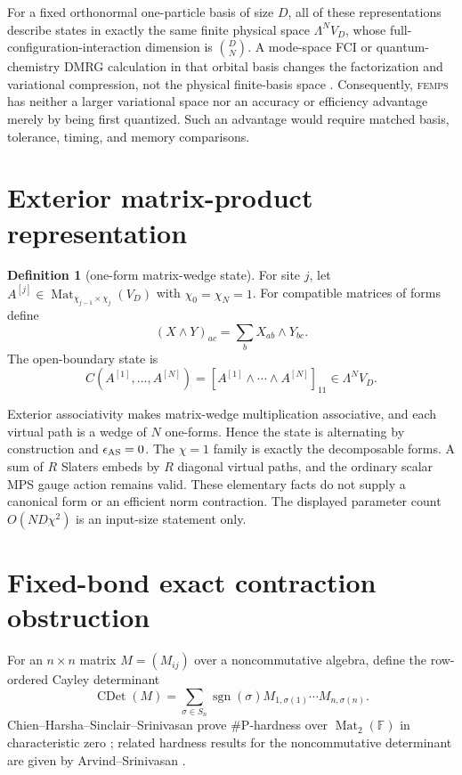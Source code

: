 \documentclass[aps,pra,reprint,superscriptaddress,nofootinbib,longbibliography,showkeys]{revtex4-2}
\theoremstyle{definition}
\newtheorem{definition}[theorem]{Definition}
\newcommand{\Mat}{\operatorname{Mat}}
\newcommand{\CDet}{\operatorname{CDet}}
\newcommand{\FEMPS}{\textnormal{\textsc{femps}}}
\begin{document}
For a fixed orthonormal one-particle basis of size $D$, all of these
representations describe states in exactly the same finite physical space
$\Lambda^N V_D$, whose full-configuration-interaction dimension is
$\binom{D}{N}$.  A mode-space FCI or quantum-chemistry DMRG calculation in
that orbital basis changes the factorization and variational compression, not
the physical finite-basis space \cite{ChanSharma2011DMRG,LiChan2016HSMPS}.
Consequently, \FEMPS{} has neither a larger variational space nor an accuracy
or efficiency advantage merely by being first quantized.  Such an advantage
would require matched basis, tolerance, timing, and memory comparisons.

\section{Exterior matrix-product representation}

\begin{definition}[one-form matrix-wedge state]
For site $j$, let
$A^{[j]}\in\Mat_{\chi_{j-1}\times\chi_j}(V_D)$ with
$\chi_0=\chi_N=1$.  For compatible matrices of forms define
\[
 (X\wedge Y)_{ac}=\sum_b X_{ab}\wedge Y_{bc}.
\]
The open-boundary state is
\begin{equation}
 C(A^{[1]},\ldots,A^{[N]})=
 [A^{[1]}\wedge\cdots\wedge A^{[N]}]_{11}
 \in\Lambda^N V_D.
 \label{eq:femps}
\end{equation}
\end{definition}

Exterior associativity makes matrix-wedge multiplication associative, and each
virtual path is a wedge of $N$ one-forms.  Hence the state is alternating by
construction and $\epsilon_{\rm AS}=0$.  The $\chi=1$ family is exactly the
decomposable forms.  A sum of $R$ Slaters embeds by $R$ diagonal virtual paths,
and the ordinary scalar MPS gauge action remains valid.  These elementary
facts do not supply a canonical form or an efficient norm contraction.  The
displayed parameter count $O(ND\chi^2)$ is an input-size statement only.

\section{Fixed-bond exact contraction obstruction}

For an $n\times n$ matrix $M=(M_{ij})$ over a noncommutative algebra, define
the row-ordered Cayley determinant
\[
 \CDet(M)=\sum_{\sigma\in S_n}\operatorname{sgn}(\sigma)
 M_{1,\sigma(1)}\cdots M_{n,\sigma(n)}.
\]
Chien--Harsha--Sinclair--Srinivasan prove \#P-hardness over
$\Mat_2(\mathbb F)$ in characteristic zero
\cite{ChienHarshaSinclairSrinivasan2011NoncommDet}; related hardness results
for the noncommutative determinant are given by Arvind--Srinivasan
\cite{ArvindSrinivasan2018NoncommDet}.
\end{document}
